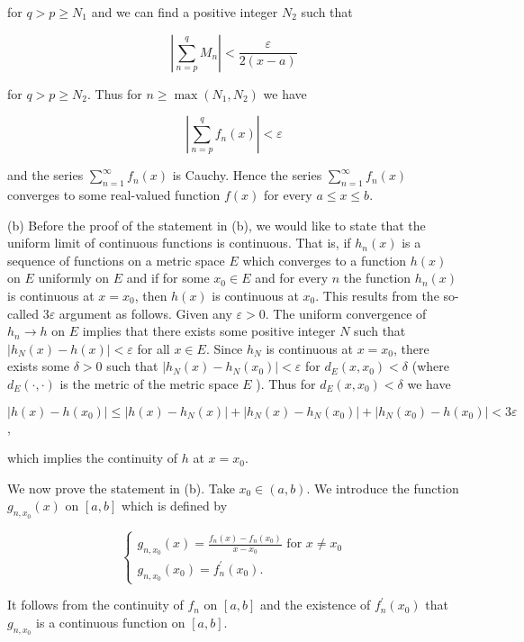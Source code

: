 \documentclass[10pt]{article}
\begin{document}
for $q>p \geq N_{1}$ and we can find a positive integer $N_{2}$ such that

$$
\left|\sum_{n=p}^{q} M_{n}\right|<\frac{\varepsilon}{2(x-a)}
$$

for $q>p \geq N_{2}$. Thus for $n \geq \max \left(N_{1}, N_{2}\right)$ we have

$$
\left|\sum_{n=p}^{q} f_{n}(x)\right|<\varepsilon
$$

and the series $\sum_{n=1}^{\infty} f_{n}(x)$ is Cauchy. Hence the series $\sum_{n=1}^{\infty} f_{n}(x)$ converges to some real-valued function $f(x)$ for every $a \leq x \leq b$.

(b) Before the proof of the statement in (b), we would like to state that the uniform limit of continuous functions is continuous. That is, if $h_{n}(x)$ is a sequence of functions on a metric space $E$ which converges to a function $h(x)$ on $E$ uniformly on $E$ and if for some $x_{0} \in E$ and for every $n$ the function $h_{n}(x)$ is continuous at $x=x_{0}$, then $h(x)$ is continuous at $x_{0}$. This results from the so-called $3 \varepsilon$ argument as follows. Given any $\varepsilon>0$. The uniform convergence of $h_{n} \rightarrow h$ on $E$ implies that there exists some positive integer $N$ such that $\left|h_{N}(x)-h(x)\right|<\varepsilon$ for all $x \in E$. Since $h_{N}$ is continuous at $x=x_{0}$, there exists some $\delta>0$ such that $\left|h_{N}(x)-h_{N}\left(x_{0}\right)\right|<\varepsilon$ for $d_{E}\left(x, x_{0}\right)<\delta$ (where $d_{E}(\cdot, \cdot)$ is the metric of the metric space $E$ ). Thus for $d_{E}\left(x, x_{0}\right)<\delta$ we have

$\left|h(x)-h\left(x_{0}\right)\right| \leq\left|h(x)-h_{N}(x)\right|+\left|h_{N}(x)-h_{N}\left(x_{0}\right)\right|+\left|h_{N}\left(x_{0}\right)-h\left(x_{0}\right)\right|<3 \varepsilon$,

which implies the continuity of $h$ at $x=x_{0}$.

We now prove the statement in (b). Take $x_{0} \in(a, b)$. We introduce the function $g_{n, x_{0}}(x)$ on $[a, b]$ which is defined by

$$
\left\{\begin{array}{l}
g_{n, x_{0}}(x)=\frac{f_{n}(x)-f_{n}\left(x_{0}\right)}{x-x_{0}} \text { for } x \neq x_{0} \\
g_{n, x_{0}}\left(x_{0}\right)=f_{n}^{\prime}\left(x_{0}\right) .
\end{array}\right.
$$

It follows from the continuity of $f_{n}$ on $[a, b]$ and the existence of $f_{n}^{\prime}\left(x_{0}\right)$ that $g_{n, x_{0}}$ is a continuous function on $[a, b]$.
\end{document}
